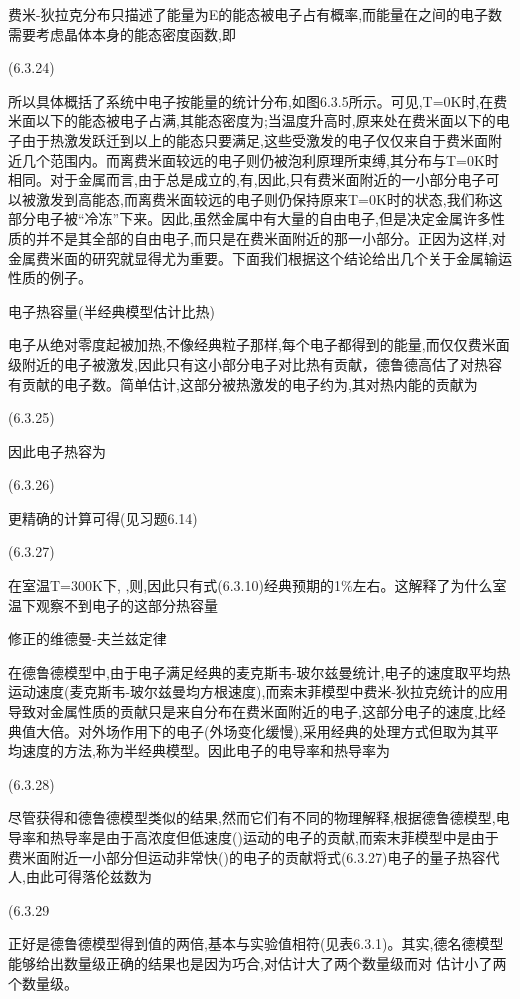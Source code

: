 费米-狄拉克分布只描述了能量为E的能态被电子占有概率,而能量在之间的电子数需要考虑晶体本身的能态密度函数,即

 	(6.3.24)



所以具体概括了系统中电子按能量的统计分布,如图6.3.5所示。可见,T=0K时,在费米面以下的能态被电子占满,其能态密度为;当温度升高时,原来处在费米面以下的电子由于热激发跃迁到以上的能态只要满足,这些受激发的电子仅仅来自于费米面附近几个范围内。而离费米面较远的电子则仍被泡利原理所束缚,其分布与T=0K时相同。对于金属而言,由于总是成立的,有,因此,只有费米面附近的一小部分电子可以被激发到高能态,而离费米面较远的电子则仍保持原来T=0K时的状态,我们称这部分电子被“冷冻”下来。因此,虽然金属中有大量的自由电子,但是决定金属许多性质的并不是其全部的自由电子,而只是在费米面附近的那一小部分。正因为这样,对金属费米面的研究就显得尤为重要。下面我们根据这个结论给出几个关于金属输运性质的例子。

电子热容量(半经典模型估计比热)

电子从绝对零度起被加热,不像经典粒子那样,每个电子都得到的能量,而仅仅费米面级附近的电子被激发,因此只有这小部分电子对比热有贡献，德鲁德高估了对热容有贡献的电子数。简单估计,这部分被热激发的电子约为,其对热内能的贡献为

 	(6.3.25)

因此电子热容为

	(6.3.26)

更精确的计算可得(见习题6.14)

 	(6.3.27)

在室温T=300K下, ,则,因此只有式(6.3.10)经典预期的1\%左右。这解释了为什么室温下观察不到电子的这部分热容量

修正的维德曼-夫兰兹定律

在德鲁德模型中,由于电子满足经典的麦克斯韦-玻尔兹曼统计,电子的速度取平均热运动速度(麦克斯韦-玻尔兹曼均方根速度),而索末菲模型中费米-狄拉克统计的应用导致对金属性质的贡献只是来自分布在费米面附近的电子,这部分电子的速度,比经典值大倍。对外场作用下的电子(外场变化缓慢),采用经典的处理方式但取为其平均速度的方法,称为半经典模型。因此电子的电导率和热导率为

 	(6.3.28)

尽管获得和德鲁德模型类似的结果,然而它们有不同的物理解释,根据德鲁德模型,电导率和热导率是由于高浓度但低速度()运动的电子的贡献,而索末菲模型中是由于费米面附近一小部分但运动非常快()的电子的贡献将式(6.3.27)电子的量子热容代人,由此可得落伦兹数为

 	(6.3.29

正好是德鲁德模型得到值的两倍,基本与实验值相符(见表6.3.1)。其实,德名德模型能够给出数量级正确的结果也是因为巧合,对估计大了两个数量级而对 估计小了两个数量级。

